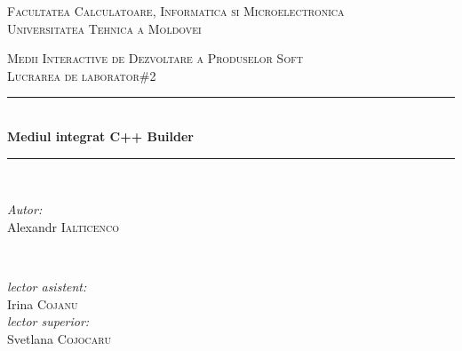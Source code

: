 \documentclass[12pt]{article}
\begin{document}
\begin{titlepage}
\begin{center} 
 \textsc{\large Facultatea Calculatoare, Informatica si Microelectronica}\\[0.5cm]
\textsc{\large Universitatea Tehnica a Moldovei}\\[1.2cm] 
\vspace{25 mm}

\textsc{\Large Medii Interactive de Dezvoltare a Produselor Soft}\\[0.5cm] 
\textsc{\large Lucrarea de laborator\#2}\\[0.5cm] \newcommand{\HRule}{\rule{\linewidth}{0.5mm}} 
  \vspace{10 mm}
  \HRule \\[0.4cm]
  { \LARGE \bfseries Mediul integrat C++ Builder  }\\[0.4cm] 
  \HRule \\[1.5cm]
      \vspace{30mm}

      \begin{minipage}{0.4\textwidth}
      \begin{flushleft} \large
      \emph{Autor:}\\
      Alexandr \textsc{Ialticenco}
      \end{flushleft}
      \end{minipage}
      ~
      \begin{minipage}{0.4\textwidth}
      \begin{flushright} \large
      \emph{lector asistent:} \\
      Irina \textsc{Cojanu} \\ 
      \emph{lector superior:} \\
      Svetlana \textsc{Cojocaru} 
      \end{flushright}
      \end{minipage}\\[4cm]

      \vspace{5 mm}

      \vfill
      \end{center}
      
\end{titlepage}
\end{document}
